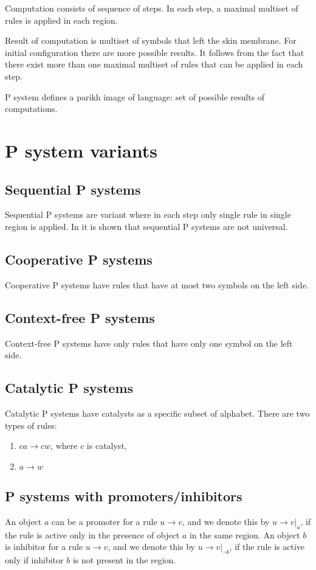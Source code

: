 \documentclass[a4paper,10pt]{article}
\begin{document}
Computation consists of sequence of steps. In each step, a maximal multiset of rules is applied in each region.

Result of computation is multiset of symbols that left the skin membrane. For initial configuration there are more possible results. It follows from the fact that there exist more than one maximal multiset of rules that can be applied in each step.

P system defines a parikh image of language: set of possible results of computations.

\section{P system variants}

\subsection{Sequential P systems}
Sequential P systems are variant where in each step only single rule in single region is applied. In \cite{Ibarra:2005:SPS:2111772.2111880} it is shown that sequential P systems are not universal.

\subsection{Cooperative P systems}
Cooperative P systems have rules that have at most two symbols on the left side.

\subsection{Context-free P systems}
Context-free P systems have only rules that have only one symbol on the left side.

\subsection{Catalytic P systems}
Catalytic P systems have catalysts as a specific subset of alphabet. There are two types of rules:
\begin{enumerate}
	\item $ca\rightarrow cw$, where $c$ is catalyst,
	\item $a\rightarrow w$
\end{enumerate}

\subsection{P systems with promoters/inhibitors}
An object $a$ can be a promoter for a rule $u\rightarrow v$, and we denote this by $u\rightarrow v|_a$, if the rule is active only in the presence of object $a$ in the same region. An object $b$ is inhibitor for a rule $u\rightarrow v$, and we denote this by $u\rightarrow v|_{\neg b}$, if the rule is active only if inhibitor $b$ is not present in the region.
\end{document}
